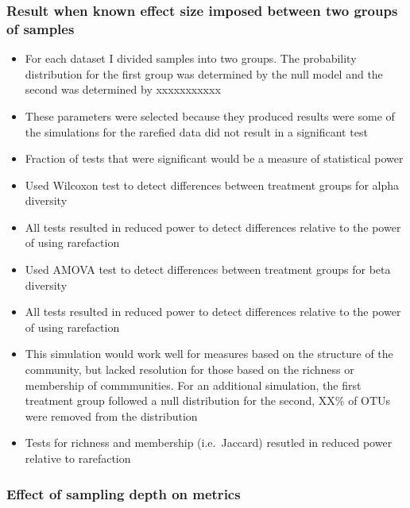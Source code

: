 \documentclass[
]{article}
\begin{document}
\hypertarget{result-when-known-effect-size-imposed-between-two-groups-of-samples}{%
\subsubsection{Result when known effect size imposed between two groups
of
samples}\label{result-when-known-effect-size-imposed-between-two-groups-of-samples}}

\begin{itemize}
\item
  For each dataset I divided samples into two groups. The probability
  distribution for the first group was determined by the null model and
  the second was determined by xxxxxxxxxxx
\item
  These parameters were selected because they produced results were some
  of the simulations for the rarefied data did not result in a
  significant test
\item
  Fraction of tests that were significant would be a measure of
  statistical power
\item
  Used Wilcoxon test to detect differences between treatment groups for
  alpha diversity
\item
  All tests resulted in reduced power to detect differences relative to
  the power of using rarefaction
\item
  Used AMOVA test to detect differences between treatment groups for
  beta diversity
\item
  All tests resulted in reduced power to detect differences relative to
  the power of using rarefaction
\item
  This simulation would work well for measures based on the structure of
  the community, but lacked resolution for those based on the richness
  or membership of commmunities. For an additional simulation, the first
  treatment group followed a null distribution for the second, XX\% of
  OTUs were removed from the distribution
\item
  Tests for richness and membership (i.e.~Jaccard) resutled in reduced
  power relative to rarefaction
\end{itemize}

\hypertarget{effect-of-sampling-depth-on-metrics}{%
\subsubsection{Effect of sampling depth on
metrics}\label{effect-of-sampling-depth-on-metrics}}
\end{document}
